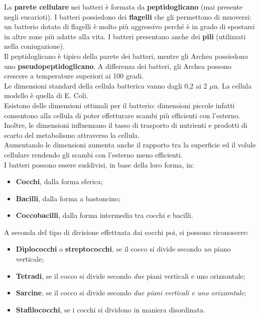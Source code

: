 \documentclass[11pt]{book}
\begin{document}
La \textbf{parete cellulare} nei batteri è formata da \textbf{peptidoglicano} (mai presente negli eucarioti).
I batteri possiedono dei \textbf{flagelli} che gli permettono di muoversi: un batterio dotato di flagelli è molto più aggressivo perché è in grado di spostarsi in altre zone più adatte alla vita.
I batteri presentano anche dei \textbf{pili} (utilizzati nella coniugazione).\\

Il peptidoglicano è tipico della parete dei batteri, mentre gli Archea possiedono uno \textbf{pseudopeptidoglicano}.
A differenza dei batteri, gli Archea possono crescere a temperature superiori ai 100 gradi.\\

Le dimensioni standard della cellula batterica vanno dagli 0,2 ai 2 $\mu$n.
La cellula modello è quella di E. Coli.\\

Esistono delle dimensioni ottimali per il batterio: dimensioni piccole infatti consentono alla cellula di poter effetturare scambi più efficienti con l'esterno. Inoltre, le dimensioni influenzano il tasso di trasporto di nutrienti e prodotti di scarto del metabolismo attraverso la cellula.\\

Aumentando le dimensioni aumenta anche il rapporto tra la superficie ed il volule cellulare rendendo gli scambi con l'esterno meno efficienti.\\

I batteri possono essere suddivisi, in base della loro forma, in:
\begin{itemize}
\item \textbf{Cocchi}, dalla forma sferica;
\item \textbf{Bacilli}, dalla forma a bastoncino;
\item \textbf{Coccobacilli}, dalla forma intermedia tra cocchi e bacilli.
\end{itemize}
\clearpage
A seconda del tipo di divisione effettuata dai cocchi poi, si possono riconoscere:
\begin{itemize}
\item \textbf{Diplococchi} o \textbf{streptococchi}, se il cocco si divide secondo \emph{un} piano verticale;
\item \textbf{Tetradi}, se il cocco si divide secondo \emph{due} piani verticali e uno orizzontale;
\item \textbf{Sarcine}, se il cocco si divide secondo \emph{due piani verticali e uno orizzontale};
\item \textbf{Stafilococchi}, se i cocchi si dividono in maniera disordinata.
\end{itemize}
\end{document}

